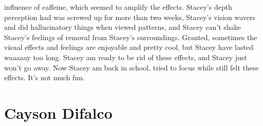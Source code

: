 \documentclass[12pt]{book}
\begin{document}
influence of caffeine, which seemed to amplify the effects. Stacey's depth perception had was screwed up for more than two weeks, Stacey's vision wavers and did hallucinatory things when viewed patterns, and Stacey can't shake Stacey's feelings of removal from Stacey's surroundings. Granted, sometimes the visual effects and feelings are enjoyable and pretty cool, but Stacey have lasted waaaaay too long. Stacey am ready to be rid of these effects, and Stacey just won't go away. Now Stacey am back in school, tried to focus while still felt these effects. It's not much fun.



\chapter{Cayson Difalco}
\end{document}
